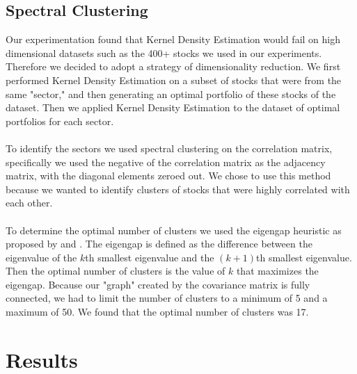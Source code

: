 \documentclass[10pt]{article}
\begin{document}
\subsection{Spectral Clustering}
Our experimentation found that Kernel Density Estimation would fail on high dimensional datasets such as 
the 400+ stocks we used in our experiments. Therefore we decided to adopt a strategy of dimensionality reduction. We first 
performed Kernel Density Estimation on a subset of stocks that were from the same "sector," and then generating an optimal portfolio
of these stocks of the dataset. Then we applied Kernel Density Estimation to the dataset of optimal portfolios for 
each sector.\\\\
To identify the sectors we used spectral clustering on the correlation matrix, specifically we used the negative of the 
correlation matrix as the adjacency matrix, with the diagonal elements zeroed out. We chose to use this method because 
we wanted to identify clusters of stocks that were highly correlated with each other.\\\\
To determine the optimal number of clusters we used the eigengap heuristic as proposed by \cite{von2007tutorial} and 
\cite{ng2002spectral}. The eigengap is defined as the difference between the eigenvalue of the $k$th smallest
eigenvalue and the $(k+1)$th smallest eigenvalue. Then the optimal number of clusters is the value of $k$ that maximizes
the eigengap. Because our "graph" created by the covariance matrix is fully connected, we had to limit the number of 
clusters to a minimum of 5 and a maximum of 50. We found that the optimal number of clusters was 17.
\section{Results}
\end{document}
